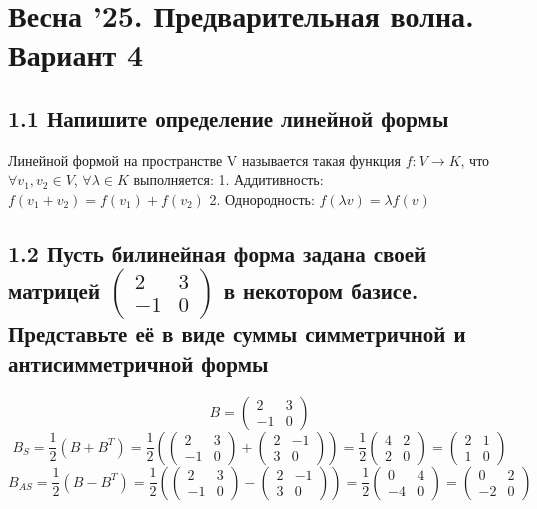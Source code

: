\documentclass{article}
\begin{document}
\section*{Весна '25. Предварительная волна. Вариант 4}

\subsection*{1.1 Напишите определение линейной формы}
Линейной формой на пространстве V называется такая функция \( f : V \rightarrow K \), что \(\forall v_1, v_2 \in V\), \(\forall \lambda \in K\) выполняется:
1. Аддитивность: \( f(v_1 + v_2) = f(v_1) + f(v_2) \)
2. Однородность: \( f(\lambda v) = \lambda f(v) \)

\subsection*{1.2 Пусть билинейная форма задана своей матрицей \( \begin{pmatrix} 2 & 3 \\ -1 & 0 \end{pmatrix} \) в некотором базисе. Представьте её в виде суммы симметричной и антисимметричной формы}
\[B = \begin{pmatrix} 2 & 3 \\ -1 & 0 \end{pmatrix}\]
\[B_S = \frac{1}{2}(B + B^T) = \frac{1}{2} \left( \begin{pmatrix} 2 & 3 \\ -1 & 0 \end{pmatrix} + \begin{pmatrix} 2 & -1 \\ 3 & 0 \end{pmatrix} \right) = \frac{1}{2} \begin{pmatrix} 4 & 2 \\ 2 & 0 \end{pmatrix} = \begin{pmatrix} 2 & 1 \\ 1 & 0 \end{pmatrix}\]
\[B_{AS} = \frac{1}{2}(B - B^T) = \frac{1}{2} \left( \begin{pmatrix} 2 & 3 \\ -1 & 0 \end{pmatrix} - \begin{pmatrix} 2 & -1 \\ 3 & 0 \end{pmatrix} \right) = \frac{1}{2} \begin{pmatrix} 0 & 4 \\ -4 & 0 \end{pmatrix} = \begin{pmatrix} 0 & 2 \\ -2 & 0 \end{pmatrix}\]
\end{document}
